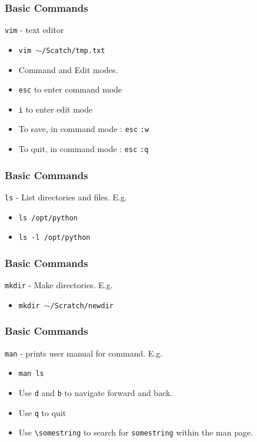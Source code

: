 \documentclass{beamer}
\newcommand{\code}[1]{\colorbox{codegray}{\texttt{#1}}}
\begin{document}

\begin{frame}
\frametitle{Basic Commands}
\code{vim} - text editor
\bigskip
\begin{itemize}
    \item \code{vim $\sim$/Scatch/tmp.txt}
    \bigskip
    \item Command and Edit modes.
    \bigskip
    \item \code{esc} to enter command mode
    \bigskip
    \item \code{i} to enter edit mode
    \bigskip
    \item To save, in command mode : \code{esc} \code{:w}
    \bigskip
    \item To quit, in command mode : \code{esc} \code{:q}
\end{itemize}
\end{frame}

\begin{frame}
\frametitle{Basic Commands}
\code{ls} - List directories and files. E.g.
\bigskip
\begin{itemize}
    \item \code{ls /opt/python }
    \bigskip

    \item \code{ls -l /opt/python} 
\end{itemize}
\end{frame}



\begin{frame}
\frametitle{Basic Commands}
\code{mkdir} - Make directories. E.g.
\bigskip
\begin{itemize}
    \item \code{mkdir $\sim$/Scratch/newdir}
\end{itemize}
\end{frame}


\begin{frame}
\frametitle{Basic Commands}
\code{man} - prints user manual for command. E.g.
\bigskip
\begin{itemize}
    \item \code{man ls}
    \bigskip
    \item Use \code{d} and \code{b} to navigate forward and back.
    \bigskip
    \item Use \code{q} to quit
    \bigskip
    \item Use \code{\textbackslash somestring} to search for \code{somestring} within the man page.
\end{itemize}
\end{frame}
\end{document}

